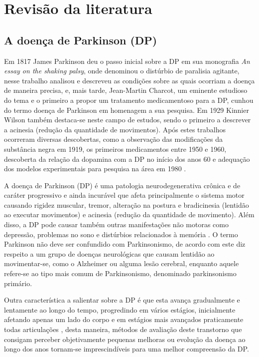 \documentclass[
	12pt,				%
	openany,			%
	oneside,			%
	a4paper,			%
	english,			%
	french,				%
	spanish,			%
	brazil				%
	]{abntex2}
\begin{document}
\chapter{Revisão da literatura}

\section{A doença de Parkinson (DP)}
Em 1817 James Parkinson deu o passo inicial sobre a DP em sua monografia \textit{An essay on the shaking palsy}, onde denominou o distúrbio de paralisia agitante, nesse trabalho analisou e descreveu as condições sobre as quais ocorriam a doença de maneira precisa, e, mais tarde, Jean-Martin Charcot, um eminente estudioso do tema e o primeiro a propor um tratamento medicamentoso para a DP, cunhou do termo doença de Parkinson em homenagem a sua pesquisa. Em 1929 Kinnier Wilson também destaca-se neste campo de estudos, sendo o primeiro a descrever a acinesia (redução da quantidade de movimentos). Após estes trabalhos ocorreram diversas descobertas, como a observação das modificações da substância negra em 1919, os primeiros medicamentos entre 1950 e 1960, descoberta da relação da dopamina com a DP no início dos anos 60 e adequação dos modelos experimentais para pesquisa na área em 1980 \cite{limongi2001,ebook2016}.

A doença de Parkinson (DP) é uma patologia neurodegenerativa crônica e de caráter progressivo e ainda incurável que afeta principalmente o sistema motor causando rigidez muscular, tremor, alteração na postura e bradicinesia (lentidão ao executar movimentos) e acinesia (redução da quantidade de movimento). Além disso, a DP pode causar também outras manifestações não motoras como depressão, problemas no sono e distúrbios relacionados à memória \cite{limongi2001}. O termo Parkinson não deve ser confundido com Parkinsonismo, de acordo com  este diz respeito a um grupo de doenças neurológicas que causam lentidão ao movimentar-se, como o Alzheimer ou alguma lesão cerebral, enquanto aquele refere-se ao tipo mais comum de Parkinsonismo, denominado parkinsonismo primário.

Outra característica a salientar sobre a DP é que esta avança gradualmente e lentamente ao longo do tempo, progredindo em vários estágios, inicialmente afetando apenas um lado do corpo e em estágios mais avançados praticamente todas articulações \cite{rewar2015}, desta maneira, métodos de avaliação deste transtorno que consigam perceber objetivamente pequenas melhoras ou evolução da doença ao longo dos anos tornam-se imprescindíveis para uma melhor compreensão da DP.
\end{document}
